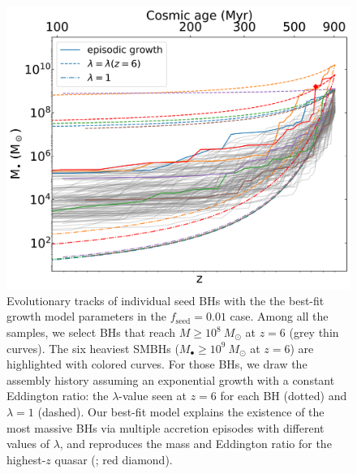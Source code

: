 \documentclass[twocolumn, twocolappendix]{aastex63}
\newcommand{\Msun}{M_\odot}
\newcommand{\fseed}{f_\mathrm{seed}}
\begin{document}
\begin{CJK*}{UTF8}{gbsn}
\begin{figure}
\centering
\includegraphics[width=125mm]{Mevol.png}
\caption{
Evolutionary tracks of individual seed BHs with the the best-fit growth model parameters in the $\fseed=0.01$ case.
Among all the samples, we select BHs that reach $M\geq 10^8~\Msun$ at $z=6$ (grey thin curves). 
The six heaviest SMBHs ($M_\bullet \geq 10^9~\Msun$ at $z=6$) are highlighted with colored curves. 
For those BHs, we draw the assembly history assuming an exponential growth with a constant Eddington ratio: 
the $\lambda$-value seen at $z=6$ for each BH (dotted) and $\lambda =1$ (dashed).
Our best-fit model explains the existence of the most massive BHs via multiple accretion episodes with different values of $\lambda$,
and reproduces the mass and Eddington ratio for the highest-$z$ quasar (\citealt{2021ApJ...907L...1W}; red diamond).
}
\label{fig:Mevol}
\vspace{5mm}
\end{figure}
%
%



\end{CJK*}
\end{document}
